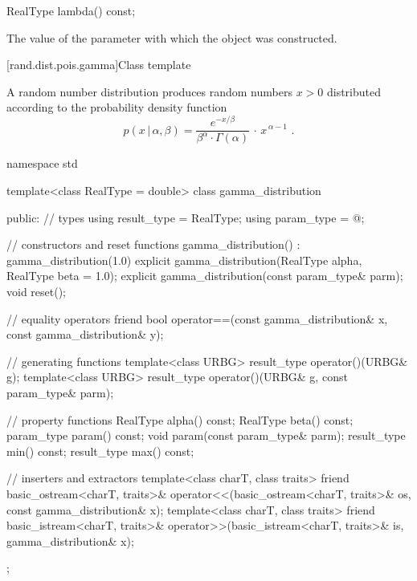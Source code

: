 %
\begin{itemdecl}
RealType lambda() const;
\end{itemdecl}

\begin{itemdescr}
\pnum
\returns
The value of the  parameter
 with which the object was constructed.
\end{itemdescr}


[rand.dist.pois.gamma]{Class template }%
%

\pnum
A  random number distribution
produces random numbers $x > 0$
distributed according to
the probability density function%
\[ p(x\,|\,\alpha,\beta) =
     \frac{e^{-x/\beta}}{\beta^{\alpha} \cdot \Gamma(\alpha)} \, \cdot \, x^{\, \alpha-1}
     \text{ .} \]

%
%
\begin{codeblock}
namespace std {
  template<class RealType = double>
  class gamma_distribution {
  public:
    // types
    using result_type = RealType;
    using param_type  = @\unspec@;

    // constructors and reset functions
    gamma_distribution() : gamma_distribution(1.0) {}
    explicit gamma_distribution(RealType alpha, RealType beta = 1.0);
    explicit gamma_distribution(const param_type& parm);
    void reset();

    // equality operators
    friend bool operator==(const gamma_distribution& x, const gamma_distribution& y);

    // generating functions
    template<class URBG>
      result_type operator()(URBG& g);
    template<class URBG>
      result_type operator()(URBG& g, const param_type& parm);

    // property functions
    RealType alpha() const;
    RealType beta() const;
    param_type param() const;
    void param(const param_type& parm);
    result_type min() const;
    result_type max() const;

    // inserters and extractors
    template<class charT, class traits>
      friend basic_ostream<charT, traits>&
        operator<<(basic_ostream<charT, traits>& os, const gamma_distribution& x);
    template<class charT, class traits>
      friend basic_istream<charT, traits>&
        operator>>(basic_istream<charT, traits>& is, gamma_distribution& x);
  };
}
\end{codeblock}


